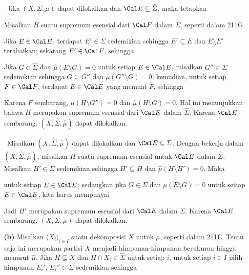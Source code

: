 {\medskip

\grheada\ Jika $(X,\Sigma,\mu)$ dapat dilokalkan dan
$\Cal E\subseteq \hat\Sigma$, maka tetapkan


\noindent Misalkan $H$ suatu supremum esensial dari $\Cal F$ dalam
$\Sigma$, seperti dalam 211G.

Jika $E\in\Cal E$, terdapat $E'\in\Sigma$ sedemikian sehingga
$E'\subseteq E$ dan $E\setminus E'$ terabaikan; sekarang
$E'\in\Cal F$, sehingga


\noindent Jika $G\in\hat\Sigma$ dan $\hat\mu(E\setminus G)=0$ untuk
setiap $E\in\Cal E$, misalkan $G''\in\Sigma$ sedemikian sehingga
$G\subseteq G''$ dan $\hat\mu(G''\setminus G)=0$; kemudian, untuk setiap
$F\in\Cal F$, terdapat $E\in\Cal E$ yang memuat $F$, sehingga


\noindent Karena $F$ sembarang, $\mu(H\setminus G'')=0$ dan
$\hat\mu(H\setminus G)=0$. Hal ini menunjukkan bahwa $H$ merupakan
supremum esensial dari $\Cal E$ dalam $\hat\Sigma$. Karena $\Cal E$
sembarang, $(X,\hat\Sigma,\hat\mu)$ dapat dilokalkan.

\medskip

\qquad\grheadb\ Misalkan $(X,\hat\Sigma,\hat\mu)$ dapat dilokalkan dan
$\Cal E\subseteq\Sigma$. Dengan bekerja dalam
$(X,\hat\Sigma,\hat\mu)$, misalkan $H$ suatu supremum esensial untuk
$\Cal E$ dalam $\hat\Sigma$. Misalkan $H'\in\Sigma$ sedemikian sehingga
$H'\subseteq H$ dan $\hat\mu(H\setminus H')=0$. Maka


\noindent untuk setiap $E\in\Cal E$; sedangkan jika $G\in\Sigma$ dan
$\mu(E\setminus G)=0$ untuk setiap $E\in\Cal E$, kita harus mempunyai


\noindent Jadi $H'$ merupakan supremum esensial dari $\Cal E$ dalam
$\Sigma$. Karena $\Cal E$ sembarang, $(X,\Sigma,\mu)$ dapat dilokalkan.

\medskip

{\bf (b)} Misalkan $\langle X_i\rangle_{i\in I}$ suatu dekomposisi $X$
untuk $\mu$, seperti dalam 211E. Tentu saja ini merupakan partisi $X$
menjadi himpunan-himpunan berukuran hingga menurut $\hat\mu$. Jika $H\subseteq X$
dan $H\cap X_i\in\hat\Sigma$ untuk setiap $i$, untuk setiap $i\in I$
pilih himpunan $E_i'$, $E_i''\in\Sigma$ sedemikian sehingga

}
